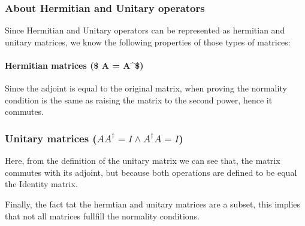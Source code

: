 \documentclass[11pt]{article}
\begin{document}
    \hypertarget{about-hermitian-and-unitary-operators}{%
\subsubsection{About Hermitian and Unitary
operators}\label{about-hermitian-and-unitary-operators}}

Since Hermitian and Unitary operators can be represented as hermitian
and unitary matrices, we know the following properties of those types of
matrices:

\hypertarget{hermitian-matrices-a-a}{%
\paragraph{\texorpdfstring{Hermitian matrices (\$ A =
A\^{}\dagger \$)}{Hermitian matrices (\$ A = A\^{}\$)}}\label{hermitian-matrices-a-a}}

Since the adjoint is equal to the original matrix, when proving the
normality condition is the same as raising the matrix to the second
power, hence it commutes.

\hypertarget{unitary-matrices-aadagger-i-wedge-adagger-a-i}{%
\subsubsection{\texorpdfstring{Unitary matrices
(\(AA^\dagger = I \wedge A^\dagger A = I\))}{Unitary matrices (AA\^{}\textbackslash{}dagger = I \textbackslash{}wedge A\^{}\textbackslash{}dagger A = I)}}\label{unitary-matrices-aadagger-i-wedge-adagger-a-i}}

Here, from the definition of the unitary matrix we can see that, the
matrix commutes with its adjoint, but because both operations are
defined to be equal the Identity matrix.

Finally, the fact tat the hermtian and unitary matrices are a subset,
this implies that not all matrices fullfill the normality conditions.


    
    
    
\end{document}
